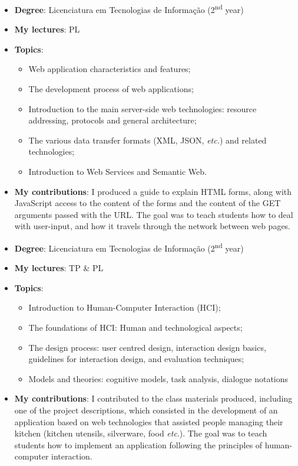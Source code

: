 \begin{itemize}
    \item \textbf{Degree}: Licenciatura em Tecnologias de Informação (2\textsuperscript{nd} year)
    \item \textbf{My lectures}: PL
    \item \textbf{Topics}:
    \begin{itemize}
        \item Web application characteristics and features;
        \item The development process of web applications;
        \item Introduction to the main server-side web technologies: resource addressing, protocols and general architecture;
        \item The various data transfer formats (XML, JSON, \emph{etc.}) and related technologies;
        \item Introduction to Web Services and Semantic Web.
    \end{itemize}
    \item \textbf{My contributions}: I produced a guide to explain HTML forms, along with JavaScript access to the content of the forms and the content of the GET arguments passed with the URL. The goal was to teach students how to deal with user-input, and how it travels through the network between web pages.
\end{itemize}


\begin{itemize}
    \item \textbf{Degree}: Licenciatura em Tecnologias de Informação (2\textsuperscript{nd} year)
    \item \textbf{My lectures}: TP \& PL
    \item \textbf{Topics}:
    \begin{itemize}
        \item Introduction to Human-Computer Interaction (HCI);
        \item The foundations of HCI: Human and technological aspects;
        \item The design process: user centred design, interaction design basics, guidelines for interaction design, and evaluation techniques;
        \item Models and theories: cognitive models, task analysis, dialogue notations
    \end{itemize}
    \item \textbf{My contributions}: I contributed to the class materials produced, including one of the project descriptions, which consisted in the development of an application based on web technologies that assisted people managing their kitchen (kitchen utensils, silverware, food \emph{etc}.). The goal was to teach students how to implement an application following the principles of human-computer interaction.
\end{itemize}

